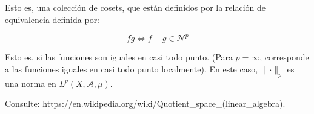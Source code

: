 Esto es, una colección de cosets, que están definidos por la relación de equivalencia definida por:

\[
	f \tilde g \Leftrightarrow f - g \in \mathcal{N}^p
\]

Esto es, si las funciones son iguales en casi todo punto. (Para $p = \infty$, corresponde a las funciones iguales en casi todo punto localmente). En este caso, $\lVert \cdot \rVert_p$ es una norma en $L^p (X, \mathcal{A}, \mu)$.

Consulte: https://en.wikipedia.org/wiki/Quotient\_space\_(linear\_algebra).





